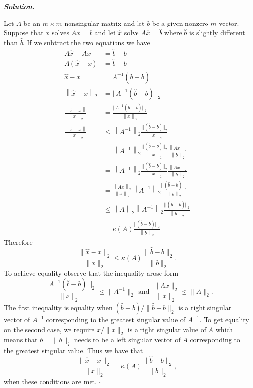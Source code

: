 \documentclass[12pt]{report}
\newenvironment{solution}[1][\it{Solution}]{\textbf{#1. } }{$\square$}
\newcommand{\norm}[1]{{\left\|#1\right\|}} %
\begin{document}
\begin{solution}
    
    \noindent
    Let $A$ be an $m\times m$ nonsingular matrix and let $b$ be a given nonzero $m$-vector. Suppose that $x$ solves $Ax = b$ and let $\hat{x}$ solve $A\hat{x} = \hat{b}$ where $\hat{b}$ is slightly different than $\hat{b}$. If we subtract the two equations we have
    \begin{align*}
        A\hat{x} - Ax &= \hat{b} - b\\
        A(\hat{x} - x) &= \hat{b} - b\\
        \hat{x} - x &= A^{-1}(\hat{b} - b)\\
        \norm{\hat{x} - x}_2 &= ||A^{-1}(\hat{b} - b)||_2\\
        \frac{\norm{\hat{x} - x}}{\norm{x}_2} &= \frac{||A^{-1}(\hat{b} - b)||_2}{\norm{x}_2}\\
        \frac{\norm{\hat{x} - x}}{\norm{x}_2} &\leq \norm{A^{-1}}_2 \frac{||(\hat{b} - b)||_2}{\norm{x}_2}\\
        &= \norm{A^{-1}}_2 \frac{||(\hat{b} - b)||_2}{\norm{x}_2} \frac{\norm{Ax}_2}{\norm{b}_2}\\
        &= \norm{A^{-1}}_2 \frac{||(\hat{b} - b)||_2}{\norm{x}_2} \frac{\norm{Ax}_2}{\norm{b}_2}\\
        &= \frac{\norm{Ax}_2}{\norm{x}_2}\norm{A^{-1}}_2 \frac{||(\hat{b} - b)||_2}{\norm{b}_2}\\
        &\leq \norm{A}_2\norm{A^{-1}}_2 \frac{||(\hat{b} - b)||_2}{\norm{b}_2}\\
        &=  \kappa(A)\frac{||(\hat{b} - b)||_2}{\norm{b}_2},
    \end{align*}
    Therefore
    \[
    \frac{\| \hat{x} - x \|_2}{\| x \|_2} \leq \kappa (A) \frac{\| \hat{b} - b \|_2}
    {\| b \|_2}.
    \]
    To achieve equality observe that the inequality arose form
    \[ \frac{\|A^{-1}(\hat{b} - b)\|_2}{\|x\|_2} \leq \|A^{-1}\|_2 ~~ \text{and} ~~ \frac{\|Ax\|_2}{\|x\|_2} \leq \|A\|_2.\]
    The first inequality is equality when $(\hat{b} - b)/\|\hat{b} - b\|_2$ is a right singular vector of $A^{-1}$ corresponding to the greatest singular value of $A^{-1}$. To get equality on the second case, we require $x/\|x\|_2$ is a right singular value of $A$ which means that $b = \|b\|_2$ needs to be a left singular vector of $A$ corresponding to the greatest singular value. Thus we have that
    \[
        \frac{\| \hat{x} - x \|_2}{\| x \|_2} = \kappa (A) \frac{\| \hat{b} - b \|_2}
        {\| b \|_2},
        \]
    when these conditions are met. 
\end{solution}
\end{document}
